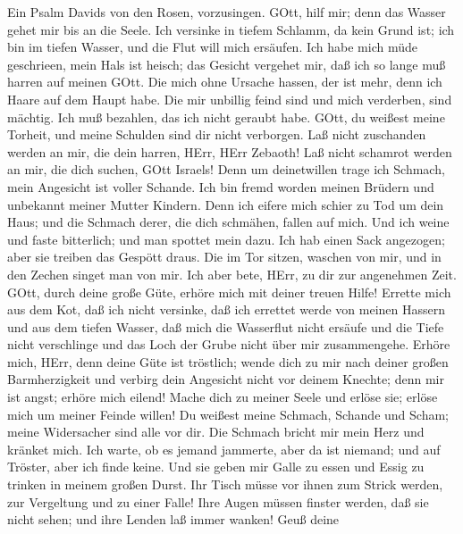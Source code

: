  Ein Psalm Davids von den Rosen, vorzusingen. 
GOtt, hilf mir; denn das Wasser gehet mir bis an die Seele. 
Ich versinke in tiefem Schlamm, da kein Grund ist; ich bin im tiefen
Wasser, und die Flut will mich ersäufen.  Ich habe mich müde
geschrieen, mein Hals ist heisch; das Gesicht vergehet mir, daß ich so
lange muß harren auf meinen GOtt.  Die mich ohne Ursache
hassen, der ist mehr, denn ich Haare auf dem Haupt habe. Die mir
unbillig feind sind und mich verderben, sind mächtig. Ich muß bezahlen,
das ich nicht geraubt habe.  GOtt, du weißest meine Torheit,
und meine Schulden sind dir nicht verborgen.  Laß nicht
zuschanden werden an mir, die dein harren, HErr, HErr Zebaoth! Laß nicht
schamrot werden an mir, die dich suchen, GOtt Israels!  Denn
um deinetwillen trage ich Schmach, mein Angesicht ist voller Schande.
 Ich bin fremd worden meinen Brüdern und unbekannt meiner
Mutter Kindern.  Denn ich eifere mich schier zu Tod um dein
Haus; und die Schmach derer, die dich schmähen, fallen auf mich.
 Und ich weine und faste bitterlich; und man spottet mein
dazu.  Ich hab einen Sack angezogen; aber sie treiben das
Gespött draus.  Die im Tor sitzen, waschen von mir, und in
den Zechen singet man von mir.  Ich aber bete, HErr, zu dir
zur angenehmen Zeit. GOtt, durch deine große Güte, erhöre mich mit
deiner treuen Hilfe!  Errette mich aus dem Kot, daß ich
nicht versinke, daß ich errettet werde von meinen Hassern und aus dem
tiefen Wasser,  daß mich die Wasserflut nicht ersäufe und
die Tiefe nicht verschlinge und das Loch der Grube nicht über mir
zusammengehe.  Erhöre mich, HErr, denn deine Güte ist
tröstlich; wende dich zu mir nach deiner großen Barmherzigkeit
 und verbirg dein Angesicht nicht vor deinem Knechte; denn
mir ist angst; erhöre mich eilend!  Mache dich zu meiner
Seele und erlöse sie; erlöse mich um meiner Feinde willen! 
Du weißest meine Schmach, Schande und Scham; meine Widersacher sind alle
vor dir.  Die Schmach bricht mir mein Herz und kränket
mich. Ich warte, ob es jemand jammerte, aber da ist niemand; und auf
Tröster, aber ich finde keine.  Und sie geben mir Galle zu
essen und Essig zu trinken in meinem großen Durst.  Ihr
Tisch müsse vor ihnen zum Strick werden, zur Vergeltung und zu einer
Falle!  Ihre Augen müssen finster werden, daß sie nicht
sehen; und ihre Lenden laß immer wanken!  Geuß deine
